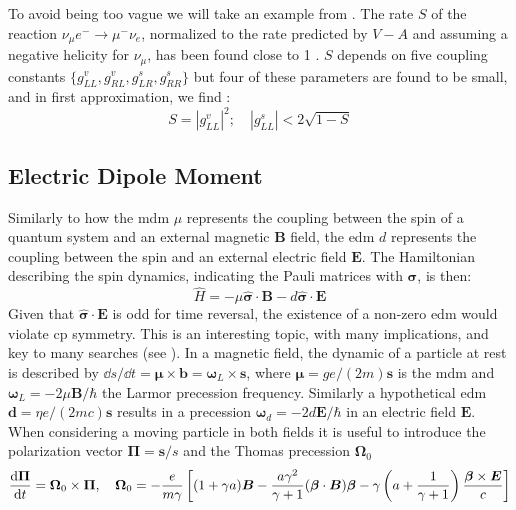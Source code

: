 \begin{refsection}
        To avoid being too vague we will take an example from \cite{PSI:review:2021}. 
        The rate $S$ of the reaction $\nu_\mu e^-\rightarrow \mu^-\nu_e$, normalized to the rate predicted by $V-A$ and assuming a negative helicity for $\nu_\mu$, has been found close to 1 \cite{muondecay:rate}.
        $S$ depends on five coupling constants $\{g^v_{LL},g^v_{RL},g^s_{LR},g^s_{RR}\}$ but four of these parameters are found to be small, and in first approximation, we find \cite{muondecay:matrix}:
        \begin{equation}
            S=|g^v_{LL}|^2; \quad |g^s_{LL}|<2\sqrt{1-S}
        \end{equation}
    
    \subsection{Electric Dipole Moment}
        \label{intro:edm}
        Similarly to how the \gls{mdm} $\mu$ represents the coupling between the spin of a quantum system and an external magnetic $\bm{B}$ field, the \gls{edm} $d$ represents the coupling between the spin and an external electric field $\bm{E}$.
        The Hamiltonian describing the spin dynamics, indicating the Pauli matrices with $\bm{\sigma}$, is then:
        \begin{equation}
            \hat{H} = -\mu\bm{\hat{\sigma}\cdot B}-d\bm{\hat{\sigma}\cdot E}
        \end{equation}
        Given that $\bm{\hat{\sigma}\cdot E}$ is odd for time reversal, the existence of a non-zero \gls{edm} would violate \gls{cp} symmetry. 
        This is an interesting topic, with many implications, and key to many searches (see     \cite{edmasprobe}). 
        In a magnetic field, the dynamic of a particle at rest is described by $\dd s/\dd t=\bm{\mu}\times\bm{b} = \bm{\omega}_L\times\bm{s}$, where $\bm{\mu}=ge/(2m)\bm{s}$ is the \gls{mdm} and $\bm{\omega}_L=-2\mu\bm{B}/\hbar$ the Larmor precession frequency.
        Similarly a hypothetical \gls{edm} $\bm{d}=\eta e/(2mc)\bm{s}$ results in a precession $\bm{\omega}_d=-2d\bm{E}/\hbar$ in an electric field $\bm{E}$.
        When considering a moving particle in both fields it is useful to introduce the polarization vector $\bm{\Pi}=\bm{s}/s$ and the Thomas precession $\bm{\Omega}_0$
        \begin{equation}
            \dv{\bm{\Pi}}{t}=\bm{\Omega}_0 \times \bm{\Pi}, \quad
            \bm{\Omega}_0 = -\frac{e}{m\gamma} \left[ (1+\gamma a)\bm{B}-\frac{a\gamma^2}{\gamma+1}(\bm{\beta}\cdot\bm{B})\bm{\beta}-\gamma \left( a+\frac{1}{\gamma+1} \right) \frac{\bm{\beta}\times \bm{E}}{c} \right]
        \end{equation}
    

\end{refsection}
